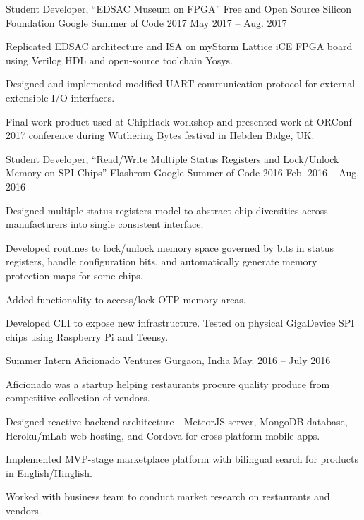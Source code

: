 
\begin{cventries}

\cventry
	{Student Developer, ``EDSAC Museum on FPGA''} %
	{Free and Open Source Silicon Foundation} %
	{Google Summer of Code 2017} %
	{May 2017 -- Aug. 2017} %
	{\begin{cvitems} %
		\item {Replicated EDSAC architecture and ISA on myStorm Lattice iCE FPGA board using Verilog HDL and open-source toolchain Yosys.}
		\item {Designed and implemented modified-UART communication protocol for external extensible I/O interfaces.}
		\item {Final work product used at ChipHack workshop and presented work at ORConf 2017 conference during Wuthering Bytes festival in Hebden Bidge, UK.}
	\end{cvitems}}

\cventry
	{Student Developer, ``Read/Write Multiple Status Registers and Lock/Unlock Memory on SPI Chips''} %
	{Flashrom} %
	{Google Summer of Code 2016} %
	{Feb. 2016 -- Aug. 2016} %
	{\begin{cvitems} %
		\item {Designed multiple status registers model to abstract chip diversities across manufacturers into single consistent interface.}
		\item {Developed routines to lock/unlock memory space governed by bits in status registers, handle configuration bits, and automatically generate memory protection maps for some chips.}
		\item {Added functionality to access/lock OTP memory areas.}
		\item {Developed CLI to expose new infrastructure. Tested on physical GigaDevice SPI chips using Raspberry Pi and Teensy.}
	\end{cvitems}}

\cventry
	{Summer Intern} %
	{Aficionado Ventures} %
	{Gurgaon, India} %
	{May. 2016 -- July 2016} %
	{\begin{cvitems} %
		\item {Aficionado was a startup helping restaurants procure quality produce from competitive collection of vendors.}
		\item {Designed reactive backend architecture - MeteorJS server, MongoDB database, Heroku/mLab web hosting, and Cordova for cross-platform mobile apps.}
		\item {Implemented MVP-stage marketplace platform with bilingual search for products in English/Hinglish.}
		\item {Worked with business team to conduct market research on restaurants and vendors.}
	\end{cvitems}}

\end{cventries}
